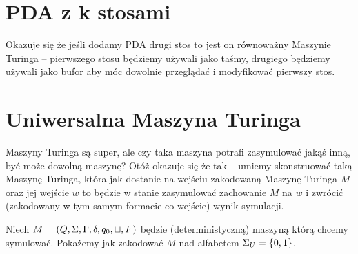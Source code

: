 \section{PDA z k stosami}

Okazuje się że jeśli dodamy PDA drugi stos to jest on równoważny Maszynie Turinga -- pierwszego stosu będziemy używali jako taśmy, drugiego będziemy używali jako bufor aby móc dowolnie przeglądać i modyfikować pierwszy stos.


\section{Uniwersalna Maszyna Turinga}

Maszyny Turinga są super, ale czy taka maszyna potrafi zasymulować jakąś inną, być może dowolną maszynę? Otóż okazuje się że tak -- umiemy skonstruować taką Maszynę Turinga, która jak dostanie na wejściu zakodowaną Maszynę Turinga \( M \) oraz jej wejście \( w \) to będzie w stanie zasymulować zachowanie \( M \) na \( w \) i zwrócić (zakodowany w tym samym formacie co wejście) wynik symulacji.

Niech \( M = (Q, \Sigma, \Gamma, \delta, q_0, \sqcup, F) \) będzie (deterministyczną) maszyną którą chcemy symulować. Pokażemy jak zakodować \( M \) nad alfabetem \( \Sigma_U = \set{0, 1} \).

